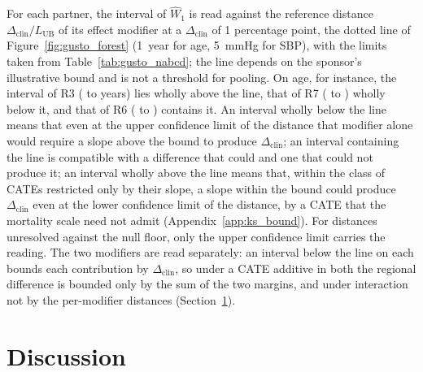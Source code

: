 \documentclass[AMA,Times1COL]{WileyNJDv5}
\begin{document}
For each partner, the interval of $\widehat{W}_1$ is read against the reference distance $\Delta_{\text{clin}} / L_{\text{UB}}$ of its effect modifier at a $\Delta_{\text{clin}}$ of 1 percentage point, the dotted line of Figure~\ref{fig:gusto_forest} (1~year for age, 5~mmHg for SBP), with the limits taken from Table~\ref{tab:gusto_nabcd}; the line depends on the sponsor's illustrative bound and is not a threshold for pooling. On age, for instance, the interval of R3 ( to  years) lies wholly above the line, that of R7 ( to ) wholly below it, and that of R6 ( to ) contains it. An interval wholly below the line means that even at the upper confidence limit of the distance that modifier alone would require a slope above the bound to produce $\Delta_{\text{clin}}$; an interval containing the line is compatible with a difference that could and one that could not produce it; an interval wholly above the line means that, within the class of CATEs restricted only by their slope, a slope within the bound could produce $\Delta_{\text{clin}}$ even at the lower confidence limit of the distance, by a CATE that the mortality scale need not admit (Appendix~\ref{app:ks_bound}). For distances unresolved against the null floor, only the upper confidence limit carries the reading. The two modifiers are read separately: an interval below the line on each bounds each contribution by $\Delta_{\text{clin}}$, so under a CATE additive in both the regional difference is bounded only by the sum of the two margins, and under interaction not by the per-modifier distances (Section~\ref{sec:discussion}).

\section{Discussion}\label{sec:discussion}
\end{document}
